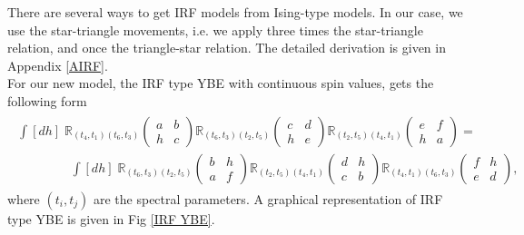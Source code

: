 \documentclass[a4paper,11pt]{article}%
\numberwithin{equation}{section}
\begin{document}
There are several ways to get IRF models from Ising-type models. In our case, we use the star-triangle movements, i.e. we apply three times the star-triangle relation, and once the triangle-star  relation. The detailed derivation is given in Appendix \ref{AIRF}.\\
For our new model, the IRF type YBE with continuous spin values,  gets the following form
\begin{align}\label{irf}
\begin{array}{l}
\displaystyle  \int [dh]\;
\mathbb{R}_{{{(t_4,t_1)(t_6,t_3)}}}\left(\begin{array}{cc}
{a} & {b} \\
{h} & {c}\end{array}\right)
\mathbb{R}_{{(t_6,t_3)(t_2,t_5)}}\left(\begin{array}{cc}
{c} & {d} \\
{h} & {e}\end{array}\right)
\mathbb{R}_{{(t_2,t_5)(t_4,t_1)}}\left(\begin{array}{cc}
{e} & {f} \\
{h} & {a}\end{array}\right)=\\
%
[5mm]
%
\displaystyle \;\;\;\;\;\;\;\;\;\;\;\;\;\;\; \int [dh]\;
\mathbb{R}_{{(t_6,t_3)(t_2,t_5)}}\left(\begin{array}{cc}
{b} & {h} \\
{a} & {f}\end{array}\right)
\mathbb{R}_{{(t_2,t_5)(t_4,t_1)}}\left(\begin{array}{cc}
{d} & {h} \\
{c} & {b}\end{array}\right)
\mathbb{R}_{{(t_4,t_1)(t_6,t_3)}}\left(\begin{array}{cc}
{f} & {h} \\
{e} & {d}\end{array}\right),\qquad
\end{array}\qquad\qquad\qquad\qquad\qquad
\end{align}
where $(t_i,t_j)$  are the spectral parameters. A graphical representation of IRF type YBE is given in Fig \ref{IRF YBE}. 
\end{document}
